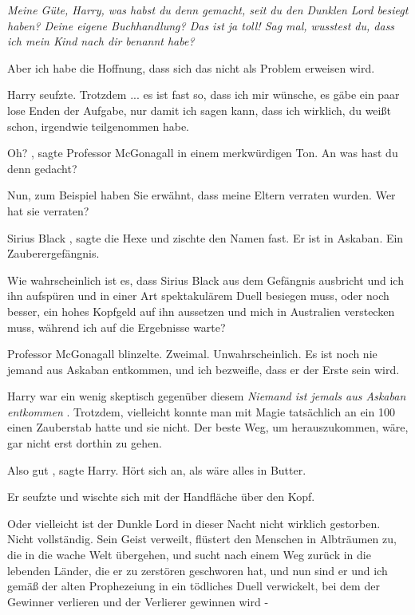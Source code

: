 \emph{Meine Güte, Harry, was habst du denn gemacht, seit du den Dunklen Lord
besiegt haben? Deine eigene Buchhandlung? Das ist ja toll! Sag mal, wusstest
du, dass ich mein Kind nach dir benannt habe?}

Aber ich habe die Hoffnung, dass sich das nicht als Problem erweisen
wird.\grqq{}

Harry seufzte. \glqq Trotzdem ... es ist fast so, dass ich mir wünsche, es gäbe
ein paar lose Enden der Aufgabe, nur damit ich sagen kann, dass ich
wirklich, du weißt schon, irgendwie teilgenommen habe.\grqq{}

\glqq Oh?\grqq{} , sagte Professor McGonagall in einem merkwürdigen Ton. \glqq
An was hast du denn gedacht?\grqq{}

\glqq Nun, zum Beispiel haben Sie erwähnt, dass meine Eltern verraten wurden.
Wer hat sie verraten?\grqq{}

\glqq Sirius Black\grqq{} , sagte die Hexe und zischte den Namen fast. \glqq Er
ist in Askaban. Ein Zauberergefängnis.\grqq{}

\glqq Wie wahrscheinlich ist es, dass Sirius Black aus dem Gefängnis ausbricht
und ich ihn aufspüren und in einer Art spektakulärem Duell besiegen muss,
oder noch besser, ein hohes Kopfgeld auf ihn aussetzen und mich in
Australien verstecken muss, während ich auf die Ergebnisse warte?\grqq{}

Professor McGonagall blinzelte. Zweimal. \glqq Unwahrscheinlich. Es ist noch nie
jemand aus Askaban entkommen, und ich bezweifle, dass er der Erste sein
wird.\grqq{}

Harry war ein wenig skeptisch gegenüber diesem \glqq \emph{Niemand ist jemals
aus Askaban entkommen}\grqq{} . Trotzdem, vielleicht konnte man mit Magie
tatsächlich an ein 100\\%
einen Zauberstab hatte und sie nicht. Der beste Weg, um herauszukommen,
wäre, gar nicht erst dorthin zu gehen.

\glqq Also gut\grqq{} , sagte Harry. \glqq Hört sich an, als wäre alles in
Butter.\grqq{}

Er seufzte und wischte sich mit der Handfläche über den Kopf.

\glqq Oder vielleicht ist der Dunkle Lord in dieser Nacht nicht wirklich
gestorben. Nicht vollständig. Sein Geist verweilt, flüstert den Menschen in
Albträumen zu, die in die wache Welt übergehen, und sucht nach einem Weg
zurück in die lebenden Länder, die er zu zerstören geschworen hat, und nun
sind er und ich gemäß der alten Prophezeiung in ein tödliches Duell
verwickelt, bei dem der Gewinner verlieren und der Verlierer gewinnen wird
-\grqq{}

